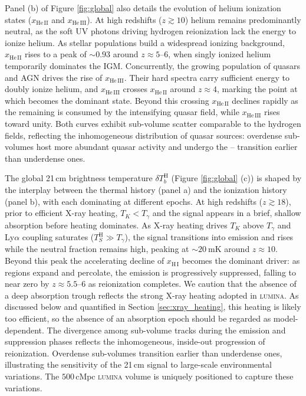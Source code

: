 \documentclass[apj,twocolumn, appendixfloats, twocolappendix, numberedappendix, tighten]{openjournal}
\DeclareRobustCommand{\lumina}{\mbox{\textsc{lumina}}\xspace}
\begin{document}
Panel (b) of Figure \ref{fig:global} also details the evolution of helium ionization states ($x_\mathrm{He\,II}$ and $x_\mathrm{He\,III}$). At high redshifts ($z \gtrsim 10$) helium remains predominantly neutral, as the soft UV photons driving hydrogen reionization lack the energy to ionize helium. As stellar populations build a widespread ionizing background, $x_\mathrm{He\,II}$ rises to a peak of $\sim 0.93$ around $z \approx 5$--$6$, when singly ionized helium temporarily dominates the IGM. Concurrently, the growing population of quasars and AGN drives the rise of $x_\mathrm{He\,III}$. Their hard spectra carry sufficient energy to doubly ionize helium, and $x_\mathrm{He\,III}$ crosses $x_\mathrm{He\,II}$ around $z \approx 4$, marking the point at which  becomes the dominant state. Beyond this crossing $x_\mathrm{He\,II}$ declines rapidly as the remaining  is consumed by the intensifying quasar field, while $x_\mathrm{He\,III}$ rises toward unity. Both curves exhibit sub-volume scatter comparable to the hydrogen fields, reflecting the inhomogeneous distribution of quasar sources: overdense sub-volumes host more abundant quasar activity and undergo the -- transition earlier than underdense ones.


The global 21\,cm brightness temperature $\delta T_b^\mathrm{H}$ (Figure \ref{fig:global} (c)) is shaped by the interplay between the thermal history (panel a) and the ionization history (panel b), with each dominating at different epochs. At high redshifts ($z \gtrsim 18$), prior to efficient X-ray heating, $T_K < T_\gamma$ and the signal appears in a brief, shallow absorption before heating dominates. As X-ray heating drives $T_K$ above $T_\gamma$ and Ly$\alpha$ coupling saturates ($T_S^\mathrm{H} \gg T_\gamma$), the signal transitions into emission and rises while the neutral fraction remains high, peaking at $\sim 20\ \mathrm{mK}$ around $z \approx 10$. Beyond this peak the accelerating decline of $x_\mathrm{H\,I}$ becomes the dominant driver: as  regions expand and percolate, the emission is progressively suppressed, falling to near zero by $z \approx 5.5$--$6$ as reionization completes. We caution that the absence of a deep absorption trough reflects the strong X-ray heating adopted in \lumina. As discussed below and quantified in Section \ref{sec:xray_heating}, this heating is likely too efficient, so the absence of an absorption epoch should be regarded as model-dependent. The divergence among sub-volume tracks during the emission and suppression phases reflects the inhomogeneous, inside-out progression of reionization. Overdense sub-volumes transition earlier than underdense ones, illustrating the sensitivity of the 21\,cm signal to large-scale environmental variations. The $500\,\mathrm{cMpc}$ \lumina volume is uniquely positioned to capture these variations.
\end{document}
